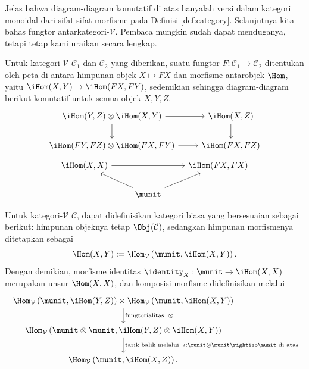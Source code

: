 \begin{definition}
\begin{center}
 \end{center}
\end{definition}

Jelas bahwa diagram-diagram komutatif di atas hanyalah versi dalam kategori monoidal dari sifat-sifat morfisme pada Definisi \ref{def:category}. Selanjutnya kita bahas fungtor antarkategori-$\mathcal{V}$. Pembaca mungkin sudah dapat menduganya, tetapi tetap kami uraikan secara lengkap.

\begin{definition}\label{def:enriched-functor}
	Untuk kategori-$\mathcal{V}$ $\mathcal{C}_1$ dan $\mathcal{C}_2$ yang diberikan, suatu fungtor $F: \mathcal{C}_1 \to \mathcal{C}_2$ ditentukan oleh peta di antara himpunan objek $X \mapsto FX$ dan morfisme antarobjek-$\Hom$, yaitu $\iHom(X, Y) \to \iHom(FX, FY)$, sedemikian sehingga diagram-diagram berikut komutatif untuk semua objek $X, Y, Z$.
	\[ \begin{tikzcd}
		\iHom(Y, Z) \otimes \iHom(X, Y) \arrow[r] \arrow[d] & \iHom(X, Z) \arrow[d] \\
		\iHom(FY, FZ) \otimes \iHom(FX, FY) \arrow[r] & \iHom(FX, FZ)
	\end{tikzcd} \]
	\[ \begin{tikzcd}
		\iHom(X, X) \arrow[rr] & & \iHom(FX, FX) \\
		& \munit \arrow[lu] \arrow[ru] &
	\end{tikzcd} \]
\end{definition}

\begin{remark}\label{rem:enriched-to-ordinary}
	Untuk kategori-$\mathcal{V}$ $\mathcal{C}$, dapat didefinisikan kategori biasa yang bersesuaian sebagai berikut: himpunan objeknya tetap $\Obj(\mathcal{C})$, sedangkan himpunan morfismenya ditetapkan sebagai
	\[ \Hom(X, Y) := \Hom_{\mathcal{V}}\left( \munit, \iHom(X, Y) \right). \]
	Dengan demikian, morfisme identitas $\identity_X: \munit \to \iHom(X, X)$ merupakan unsur $\Hom(X, X)$, dan komposisi morfisme didefinisikan melalui
	\[ \begin{tikzcd}
		\Hom_{\mathcal{V}}\left( \munit, \iHom(Y, Z) \right) \times \Hom_{\mathcal{V}}\left( \munit, \iHom(X, Y) \right) \arrow[d, "{\text{fungtorialitas }\;\otimes}"] \\
		\Hom_{\mathcal{V}}\left( \munit \otimes \munit, \iHom(Y, Z) \otimes \iHom(X, Y) \right) \arrow[d, "{\text{tarik balik melalui }\; \iota: \munit \otimes \munit \rightiso \munit \text{ di atas}}"] \\
		\Hom_{\mathcal{V}}\left( \munit, \iHom(X, Z) \right).
	\end{tikzcd} \]
\end{remark}

